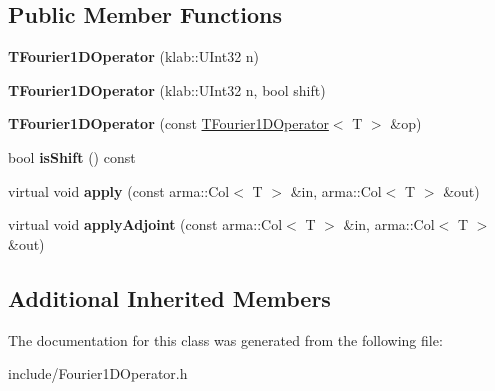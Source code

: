 \subsection*{Public Member Functions}
\begin{DoxyCompactItemize}
\item 
{\bfseries T\+Fourier1\+D\+Operator} (klab\+::\+U\+Int32 n)\hypertarget{classkl1p_1_1TFourier1DOperator_a1c9fea760a7954bd3b06c40b6b74468d}{}\label{classkl1p_1_1TFourier1DOperator_a1c9fea760a7954bd3b06c40b6b74468d}

\item 
{\bfseries T\+Fourier1\+D\+Operator} (klab\+::\+U\+Int32 n, bool shift)\hypertarget{classkl1p_1_1TFourier1DOperator_abc86ecbb37c95d7e99ac905b7175dd8a}{}\label{classkl1p_1_1TFourier1DOperator_abc86ecbb37c95d7e99ac905b7175dd8a}

\item 
{\bfseries T\+Fourier1\+D\+Operator} (const \hyperlink{classkl1p_1_1TFourier1DOperator}{T\+Fourier1\+D\+Operator}$<$ T $>$ \&op)\hypertarget{classkl1p_1_1TFourier1DOperator_a4528ebf2d0aaed922d32a861880fd8e0}{}\label{classkl1p_1_1TFourier1DOperator_a4528ebf2d0aaed922d32a861880fd8e0}

\item 
bool {\bfseries is\+Shift} () const \hypertarget{classkl1p_1_1TFourier1DOperator_ae32414af3c074092e3478817baace71a}{}\label{classkl1p_1_1TFourier1DOperator_ae32414af3c074092e3478817baace71a}

\item 
virtual void {\bfseries apply} (const arma\+::\+Col$<$ T $>$ \&in, arma\+::\+Col$<$ T $>$ \&out)\hypertarget{classkl1p_1_1TFourier1DOperator_ae10c86766d42453672c558d92c08d51a}{}\label{classkl1p_1_1TFourier1DOperator_ae10c86766d42453672c558d92c08d51a}

\item 
virtual void {\bfseries apply\+Adjoint} (const arma\+::\+Col$<$ T $>$ \&in, arma\+::\+Col$<$ T $>$ \&out)\hypertarget{classkl1p_1_1TFourier1DOperator_a852c3195f47ce84f09d7fbf333153eaf}{}\label{classkl1p_1_1TFourier1DOperator_a852c3195f47ce84f09d7fbf333153eaf}

\end{DoxyCompactItemize}
\subsection*{Additional Inherited Members}


The documentation for this class was generated from the following file\+:\begin{DoxyCompactItemize}
\item 
include/Fourier1\+D\+Operator.\+h\end{DoxyCompactItemize}
